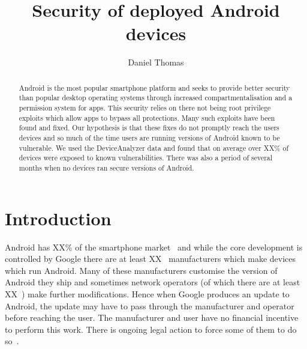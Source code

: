 \documentclass[conference,a4paper,twoside]{IEEEtran}
\author{Daniel Thomas}
\begin{document}
\title{Security of deployed Android devices}


\author{
}


\maketitle


\begin{abstract}
Android is the most popular smartphone platform and seeks to provide better security than popular desktop operating systems through increased compartmentalisation and a permission system for apps.
This security relies on there not being root privilege exploits which allow apps to bypass all protections.
Many such exploits have been found and fixed.
Our hypothesis is that these fixes do not promptly reach the users devices and so much of the time users are running versions of Android known to be vulnerable.
We used the DeviceAnalyzer data\cite{TODO} and found that on average over XX\% of devices were exposed to known vulnerabilities. %
There was also a period of several months when no devices ran secure versions of Android.
\end{abstract}

\section{Introduction}
Android has XX\% of the smartphone market~\cite{TODO} and while the core development is controlled by Google there are at least XX~\cite{TODO} manufacturers which make devices which run Android.
Many of these manufacturers customise the version of Android they ship and sometimes network operators (of which there are at least XX~\cite{TODO}) make further modifications.
Hence when Google produces an update to Android, the update may have to pass through the manufacturer and operator before reaching the user.
The manufacturer and user have no financial incentive to perform this work.
There is ongoing legal action to force some of them to do so~\cite{TODO}.
\end{document}
